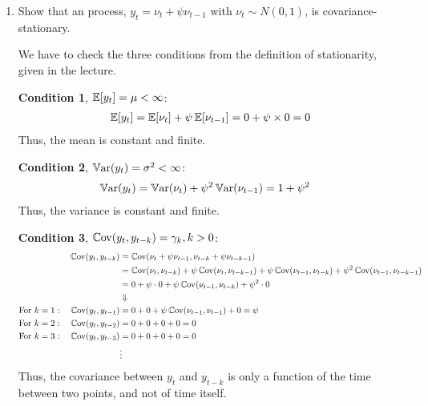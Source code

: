 \begin{enumerate}
    \item Show that an \maq[1]{} process, $y_t = \nu_t + \psi \nu_{t-1}$ with $\nu_t \sim N(0, 1)$, is covariance-stationary.

          \begin{sol}
              We have to check the three conditions from the definition of stationarity, given in the lecture.

              \textbf{Condition 1}, $\operatorname*{\mathbb{E}}[y_t] = \mu < \infty$:
              \begin{align*}
                  \operatorname*{\mathbb{E}}[y_t] = \operatorname*{\mathbb{E}}[\nu_t] + \psi \operatorname*{\mathbb{E}}[\nu_{t-1}]
                  = 0 + \psi \times 0
                  = 0
              \end{align*}
              Thus, the mean is constant and finite.

              \textbf{Condition 2}, $\operatorname*{\mathbb{V}ar}(y_t) = \sigma^2 < \infty$:
              \begin{align*}
                  \operatorname*{\mathbb{V}ar}(y_t)
                   & = \operatorname*{\mathbb{V}ar}(\nu_t) + \psi^2 \operatorname*{\mathbb{V}ar}(\nu_{t-1})
                  = 1 + \psi^2
              \end{align*}
              Thus, the variance is constant and finite.

              \textbf{Condition 3}, $\operatorname*{\mathbb{C}ov}(y_t, y_{t-k}) = \gamma_k, k>0$:
              \begin{align*}
                  \operatorname*{\mathbb{C}ov}(y_t, y_{t-k})
                   & = \operatorname*{\mathbb{C}ov}(\nu_t + \psi \nu_{t-1}, \nu_{t-k} + \psi \nu_{t-k-1})
                  \\
                   & = \operatorname*{\mathbb{C}ov}(\nu_t, \nu_{t-k})
                  + \psi\operatorname*{\mathbb{C}ov}(\nu_t, \nu_{t-k-1})
                  + \psi\operatorname*{\mathbb{C}ov}(\nu_{t-1}, \nu_{t-k})
                  + \psi^2\operatorname*{\mathbb{C}ov}(\nu_{t-1}, \nu_{t-k-1})
                  \\
                  & = 0 + \psi \cdot 0 + \psi\operatorname*{\mathbb{C}ov}(\nu_{t-1}, \nu_{t-k}) + \psi^2\cdot 0 \\
                   & \Downarrow
                  \\
                  \text{For $k=1$}: \quad \operatorname*{\mathbb{C}ov}(y_t, y_{t-1})
                   & = 0 + 0 + \psi \operatorname*{\mathbb{C}ov}(\nu_{t-1}, \nu_{t-1}) + 0 = \psi 
                  \\
                  \text{For $k=2$}: \quad \operatorname*{\mathbb{C}ov}(y_t, y_{t-2})
                   & = 0 + 0 + 0 + 0 = 0
                  \\
                  \text{For $k=3$}: \quad \operatorname*{\mathbb{C}ov}(y_t, y_{t-3})
                   & = 0 + 0 + 0 + 0 = 0
                  \\
                   & \vdots
              \end{align*}
              Thus, the covariance between $y_t$ and $y_{t-k}$ is only a function of the time between two points, and not of time itself.
          \end{sol}


\end{enumerate}
